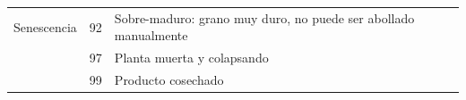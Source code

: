 \begin{longtable}{p{3cm}p{1cm}p{9cm}}
Senescencia                                & 92   & Sobre-maduro: grano muy duro, no puede ser abollado manualmente                                                                          \\
                                           & 97   & Planta muerta y colapsando                                                                                                               \\
                                           & 99   & Producto cosechado                                                                                                                     
                                           
\end{longtable}

